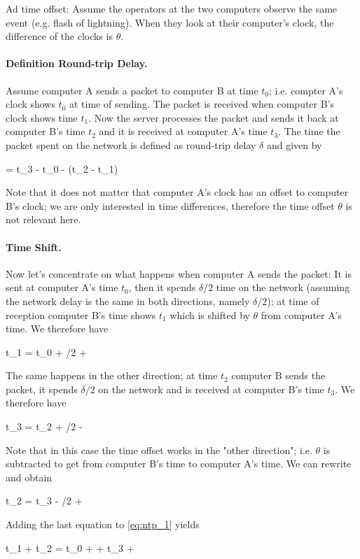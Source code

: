 Ad time offset: Assume the operators at the two computers observe the same event (e.g. flash of lightning). When they look at their computer's clock, the difference of the clocks is $\theta$.

\paragraph{Definition Round-trip Delay.} Assume computer A sends a packet to computer B at time $t_0$; i.e. compter A's clock shows $t_0$ at time of sending. The packet is received when computer B's clock shows time $t_1$. Now the server processes the packet and sends it back at computer B's time $t_2$ and it is received at computer A's time $t_3$. The time the packet spent on the network is defined as round-trip delay $\delta$ and given by

\bee
\delta = t_3 - t_0 - (t_2 - t_1)
\eee

Note that it does not matter that computer A's clock has an offset to computer B's clock; we are only interested in time differences, therefore the time offset $\theta$ is not relevant here.

\paragraph{Time Shift.} Now let's concentrate on what happens when computer A sends the packet: It is sent at computer A's time $t_0$, then it spends $\delta/2$ time on the network (assuming the network delay is the same in both directions, namely $\delta/2$); at time of reception computer B's time shows $t_1$ which is shifted by $\theta$ from computer A's time. We therefore have

\be\label{eq:ntp_1}
t_1 = t_0 + \delta/2 + \theta
\ee

The same happens in the other direction; at time $t_2$ computer B sends the packet, it spends $\delta/2$ on the network and is received at computer B's time $t_3$. We therefore have

\bee
t_3 = t_2 + \delta/2 - \theta
\eee

Note that in this case the time offset works in the "other direction"; i.e. $\theta$ is subtracted to get from computer B's time to computer A's time. We can rewrite and obtain

\be\label{eq:ntp_2}
t_2 = t_3 - \delta/2 + \theta
\ee

Adding the last equation to \eqref{eq:ntp_1} yields

\bee
t_1 + t_2 = t_0 + \theta + t_3 + \theta
\eee

